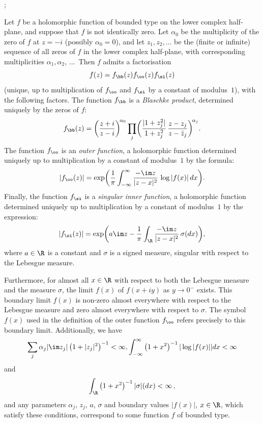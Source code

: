 \begin{theo}{\cite[Theorem~II.5.5 and Corollary~II.5.7]{bib:g07}; \cite[Theorem~13.15]{bib:m09}}\label{thm:fact}

Let $f$ be a holomorphic function of bounded type on the lower complex half-plane, and suppose that $f$ is not identically zero. Let $\alpha_0$ be the multiplicity of the zero of $f$ at $z = -i$ (possibly $\alpha_0 = 0$), and let $z_1, z_2, \ldots$ be the (finite or infinite) sequence of all zeros of $f$ in the lower complex half-plane, with corresponding multiplicities $\alpha_1, \alpha_2,\,\ldots\,$ Then $f$ admits a factorisation
\begin{equation}\label{eq:fact}
f(z) = f_\bb(z) f_\oo(z) f_\si(z)
\end{equation}
(unique, up to multiplication of $f_\oo$ and $f_\si$ by a constant of modulus~$1$), with the following factors. The function $f_\bb$ is a \emph{Blaschke product}, determined uniquely by the zeros of $f$:
\begin{equation}\label{eq:bb}
f_\bb(z) = \biggl(\frac{z + i}{z - i} \biggr)^{\!\alpha_0} \prod_j \biggl(\frac{|1 + z_j^2|}{1 + z_j^2} \, \frac{z - z_j}{z - \bar{z}_j} \biggr)^{\!\alpha_j}.
\end{equation}
The function $f_\oo$ is an \emph{outer function}, a holomorphic function determined uniquely up to multiplication by a constant of modulus~$1$ by the formula:
\begin{equation}\label{eq:oo}
|f_\oo(z)| = \exp \biggl(\frac{1}{\pi} \int_{-\infty}^\infty \frac{-\im z}{|z - x|^2} \, \log |f(x)| \, dx \biggr).
\end{equation}
Finally, the function $f_\si$ is a \emph{singular inner function}, a holomorphic function determined uniquely up to multiplication by a constant of modulus~$1$ by the expression:
\begin{equation}\label{eq:si}
|f_\si(z)| = \exp \biggl(a \im z - \frac{1}{\pi} \int_\R \frac{-\im z}{|z - x|^2} \, \sigma(dx) \biggr),
\end{equation}
where $a \in \R$ is a constant and $\sigma$ is a signed measure, singular with respect to the Lebesgue measure.

Furthermore, for almost all $x \in \R$ with respect to both the Lebesgue measure and the measure $\sigma$, the limit $f(x)$ of $f(x + i y)$ as $y \to 0^-$ exists. This boundary limit $f(x)$ is non-zero almost everywhere with respect to the Lebesgue measure and zero almost everywhere with respect to $\sigma$. The symbol $f(x)$ used in the definition of the outer function $f_\oo$ refers precisely to this boundary limit. Additionally, we have \[
\sum_j \alpha_j |\im z_j| \left(1 + |z_j|^2\right)^{-1} < \infty, \int_{-\infty}^\infty \left(1 + x^2\right)^{-1} |\log |f(x)|| dx < \infty
\] 
and
\[
\int_\R \left(1 + x^2\right)^{-1} |\sigma|(dx) < \infty\,,
\]
 and any parameters $\alpha_j$, $z_j$, $a$, $\sigma$ and boundary values $|f(x)|$, $x \in \R$, which satisfy these conditions, correspond to some function $f$ of bounded type.


\end{theo}
